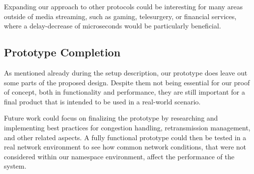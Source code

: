 Expanding our approach to other protocols could be interesting for 
many areas outside of media streaming, such as gaming, 
telesurgery, or financial services, where a delay-decrease of 
microseconds would be particularly beneficial.

\subsection{Prototype Completion}\label{sec:prototype_completion}
As mentioned already during the setup description, our prototype 
does leave out some parts of the proposed design.
Despite them not being essential for our proof of concept,
both in functionality and performance, they are still important
for a final product that is intended to be used in a real-world
scenario.

Future work could focus on finalizing the prototype by researching 
and implementing best practices for congestion handling, retransmission management, 
and other related aspects.
A fully functional prototype could then be tested in a real network
environment to see how common network conditions, that were not considered
within our namespace environment, affect the performance of the system.
